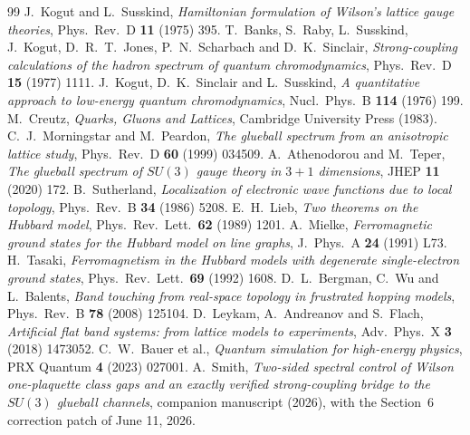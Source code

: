 \documentclass[11pt]{article}
\begin{document}
\begin{thebibliography}{99}
 J.~Kogut and L.~Susskind,
\emph{Hamiltonian formulation of Wilson's lattice gauge theories},
Phys.\ Rev.\ D \textbf{11} (1975) 395.
 T.~Banks, S.~Raby, L.~Susskind, J.~Kogut,
D.~R.~T.~Jones, P.~N.~Scharbach and D.~K.~Sinclair,
\emph{Strong-coupling calculations of the hadron spectrum of quantum
chromodynamics}, Phys.\ Rev.\ D \textbf{15} (1977) 1111.
 J.~Kogut, D.~K.~Sinclair and
L.~Susskind, \emph{A quantitative approach to low-energy quantum
chromodynamics}, Nucl.\ Phys.\ B \textbf{114} (1976) 199.
 M.~Creutz, \emph{Quarks, Gluons and Lattices},
Cambridge University Press (1983).
 C.~J.~Morningstar and M.~Peardon,
\emph{The glueball spectrum from an anisotropic lattice study},
Phys.\ Rev.\ D \textbf{60} (1999) 034509.
 A.~Athenodorou and M.~Teper,
\emph{The glueball spectrum of $SU(3)$ gauge theory in $3+1$ dimensions},
JHEP \textbf{11} (2020) 172.
 B.~Sutherland, \emph{Localization of electronic
wave functions due to local topology}, Phys.\ Rev.\ B \textbf{34} (1986)
5208.
 E.~H.~Lieb, \emph{Two theorems on the Hubbard model},
Phys.\ Rev.\ Lett.\ \textbf{62} (1989) 1201.
 A.~Mielke, \emph{Ferromagnetic ground states for the
Hubbard model on line graphs}, J.\ Phys.\ A \textbf{24} (1991) L73.
 H.~Tasaki, \emph{Ferromagnetism in the Hubbard models
with degenerate single-electron ground states}, Phys.\ Rev.\ Lett.\
\textbf{69} (1992) 1608.
 D.~L.~Bergman, C.~Wu and L.~Balents,
\emph{Band touching from real-space topology in frustrated hopping models},
Phys.\ Rev.\ B \textbf{78} (2008) 125104.
 D.~Leykam, A.~Andreanov and S.~Flach,
\emph{Artificial flat band systems: from lattice models to experiments},
Adv.\ Phys.\ X \textbf{3} (2018) 1473052.
 C.~W.~Bauer et al., \emph{Quantum simulation for
high-energy physics}, PRX Quantum \textbf{4} (2023) 027001.
 A.~Smith, \emph{Two-sided spectral control of Wilson
one-plaquette class gaps and an exactly verified strong-coupling bridge to
the $SU(3)$ glueball channels}, companion manuscript (2026), with the
Section~6 correction patch of June 11, 2026.
\end{thebibliography}
\end{document}
